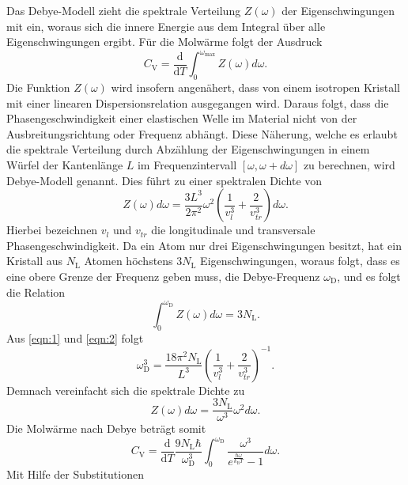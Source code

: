 Das Debye-Modell zieht die spektrale Verteilung $Z(\omega)$ der Eigenschwingungen mit ein, woraus sich die innere Energie aus dem Integral über alle Eigenschwingungen ergibt.
Für die Molwärme folgt der Ausdruck
\begin{equation}
  C_{\text{V}} = \frac{\mathrm{d}}{\mathrm{d}T}\int_{0}^{\omega_{\text{max}}}Z(\omega)d\omega.
\end{equation}
Die Funktion $Z(\omega)$ wird insofern angenähert, dass von einem isotropen Kristall mit einer linearen Dispersionsrelation ausgegangen wird.
Daraus folgt, dass die Phasengeschwindigkeit einer elastischen Welle im Material nicht von der Ausbreitungsrichtung oder Frequenz abhängt.
Diese Näherung, welche es erlaubt die spektrale Verteilung durch Abzählung der Eigenschwingungen in einem Würfel der Kantenlänge $L$ im Frequenzintervall $[\omega,\omega+d\omega]$ zu berechnen, wird Debye-Modell genannt.
Dies führt zu einer spektralen Dichte von
\begin{equation}
  Z(\omega)d\omega = \frac{3L^3}{2\pi^2}\omega^2\left(\frac{1}{v_l^3}+\frac{2}{v_{tr}^3}\right)d\omega. \label{eqn:1}
\end{equation}
Hierbei bezeichnen $v_l$ und $v_{tr}$ die longitudinale und transversale Phasengeschwindigkeit.
Da ein Atom nur drei Eigenschwingungen besitzt, hat ein Kristall aus $N_{\text{L}}$ Atomen höchstens $3N_{\text{L}}$ Eigenschwingungen, woraus folgt, dass es eine obere Grenze der Frequenz geben muss, die Debye-Frequenz $\omega_{\text{D}}$, und es folgt die Relation
\begin{equation}
  \int_{0}^{\omega_{\text{D}}}Z(\omega)d\omega = 3N_{\text{L}}. \label{eqn:2}
\end{equation}
Aus \eqref{eqn:1} und \eqref{eqn:2} folgt
\begin{equation}
  \omega_{\text{D}}^3 = \frac{18\pi^2N_{\text{L}}}{L^3}\left(\frac{1}{v_l^3}+\frac{2}{v_{tr}^3} \right)^{-1}. \label{eqn:3}
\end{equation}
Demnach vereinfacht sich die spektrale Dichte zu
\begin{equation}
  Z(\omega)d\omega = \frac{3N_{\text{L}}}{\omega^3}\omega^2d\omega.
\end{equation}
Die Molwärme nach Debye beträgt somit
\begin{equation}
  C_{\text{V}} = \frac{\mathrm{d}}{\mathrm{d}T}\frac{9N_{\text{L}}\hbar}{\omega_{\text{D}}^3} \int_{0}^{\omega_{\text{D}}}\frac{\omega^3}{e^{\frac{\hbar\omega}{k_{\text{B}}T}}-1}d\omega.
\end{equation}
Mit Hilfe der Substitutionen
